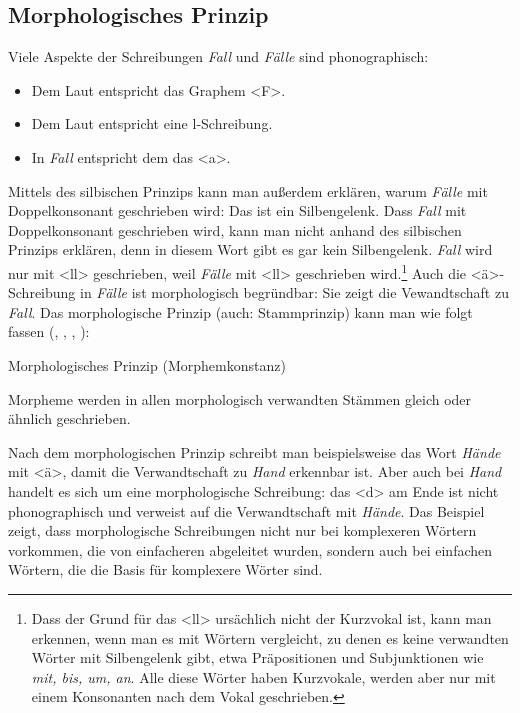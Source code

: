 \subsection{Morphologisches Prinzip}
\label{sec:MorphPrin}

Viele Aspekte der Schreibungen \textit{Fall} und \textit{Fälle} sind phonographisch:
\begin{itemize}
    \item Dem Laut \textipa{[f]} entspricht das Graphem <F>.
    \item Dem Laut \textipa{[l]} entspricht eine l-Schreibung.
    \item In \textit{Fall} entspricht dem \textipa{[a]} das <a>.
\end{itemize}

Mittels des silbischen Prinzips kann man außerdem erklären, warum \textit{Fälle} mit Doppelkonsonant geschrieben wird: Das \textipa{[l]} ist ein Silbengelenk. Dass \textit{Fall} mit Doppelkonsonant geschrieben wird, kann man nicht anhand des silbischen Prinzips erklären, denn in diesem Wort gibt es gar kein Silbengelenk. \textit{Fall} wird nur mit <ll> geschrieben, weil \textit{Fälle} mit <ll> geschrieben wird.\footnote{Dass der Grund für das <ll> ursächlich nicht der Kurzvokal ist, kann man erkennen, wenn man es mit Wörtern vergleicht, zu denen es keine verwandten Wörter mit Silbengelenk gibt, etwa Präpositionen und Subjunktionen wie \textit{mit, bis, um, an}. Alle diese Wörter haben Kurzvokale, werden aber nur mit einem Konsonanten nach dem Vokal geschrieben.} Auch die <ä>-Schreibung in \textit{Fälle} ist morphologisch begründbar: Sie zeigt die Vewandtschaft zu \textit{Fall}. Das morphologische Prinzip (auch: Stammprinzip) kann man wie folgt fassen (\cite[41]{GallmannSitta1996}, \cite[913f]{Duden2022}, \cite[239]{FuhrhopPeters2013}, \cite[505]{Schaefer2018_3Aufl}):


\begin{Definition}{Morphologisches Prinzip (Morphemkonstanz)}\label{def:morphPrinzip}

\noindent Morpheme werden in allen morphologisch verwandten Stämmen gleich oder ähnlich geschrieben.

\end{Definition}


Nach dem morphologischen Prinzip schreibt man beispielsweise das Wort \textit{Hände} mit <ä>, damit die Verwandtschaft zu \textit{Hand} erkennbar ist. Aber auch bei \textit{Hand} handelt es sich um eine morphologische Schreibung: das <d> am Ende ist nicht phonographisch und verweist auf die Verwandtschaft mit \textit{Hände}. Das Beispiel zeigt, dass morphologische Schreibungen nicht nur bei komplexeren Wörtern vorkommen, die von einfacheren abgeleitet wurden, sondern auch bei einfachen Wörtern, die die Basis für komplexere Wörter sind.

